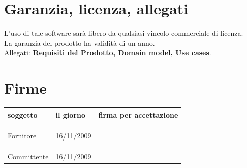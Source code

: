 \documentclass[a4paper, 12pt]{report}
\begin{document}
\section*{Garanzia, licenza, allegati}
L'uso di tale software sarà libero da qualsiasi vincolo commerciale di licenza.
\\
La garanzia del prodotto ha validit\`a di un anno.
\\
Allegati: \textbf{Requisiti del Prodotto, Domain model, Use cases}.

\newpage

\section*{Firme}
\begin{table}[h!]
  \begin{center}
    \begin{tabular}{ l  l | p{60mm} }
    \textbf{soggetto} & \textbf{il giorno} & \textbf{firma per accettazione} \\
	\hline    
	\\\\\\
	Fornitore & 16/11/2009 &  \\
	\hline\\\\\\
	Committente & 16/11/2009 &  \\
    \hline
    \end{tabular}
  \end{center}
\end{table}
\newpage
\end{document}
